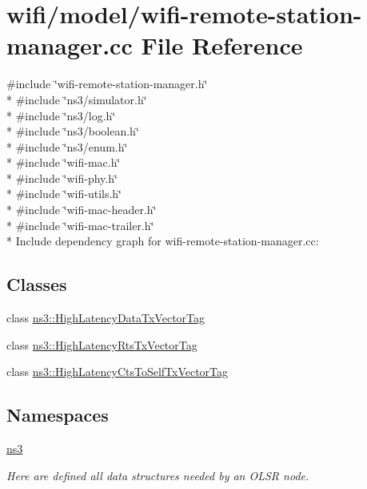 \hypertarget{wifi-remote-station-manager_8cc}{}\section{wifi/model/wifi-\/remote-\/station-\/manager.cc File Reference}
\label{wifi-remote-station-manager_8cc}
{\ttfamily \#include \char`\"{}wifi-\/remote-\/station-\/manager.\+h\char`\"{}}\\*
{\ttfamily \#include \char`\"{}ns3/simulator.\+h\char`\"{}}\\*
{\ttfamily \#include \char`\"{}ns3/log.\+h\char`\"{}}\\*
{\ttfamily \#include \char`\"{}ns3/boolean.\+h\char`\"{}}\\*
{\ttfamily \#include \char`\"{}ns3/enum.\+h\char`\"{}}\\*
{\ttfamily \#include \char`\"{}wifi-\/mac.\+h\char`\"{}}\\*
{\ttfamily \#include \char`\"{}wifi-\/phy.\+h\char`\"{}}\\*
{\ttfamily \#include \char`\"{}wifi-\/utils.\+h\char`\"{}}\\*
{\ttfamily \#include \char`\"{}wifi-\/mac-\/header.\+h\char`\"{}}\\*
{\ttfamily \#include \char`\"{}wifi-\/mac-\/trailer.\+h\char`\"{}}\\*
Include dependency graph for wifi-\/remote-\/station-\/manager.cc\+:
\subsection*{Classes}
\begin{DoxyCompactItemize}
\item 
class \hyperlink{classns3_1_1HighLatencyDataTxVectorTag}{ns3\+::\+High\+Latency\+Data\+Tx\+Vector\+Tag}
\item 
class \hyperlink{classns3_1_1HighLatencyRtsTxVectorTag}{ns3\+::\+High\+Latency\+Rts\+Tx\+Vector\+Tag}
\item 
class \hyperlink{classns3_1_1HighLatencyCtsToSelfTxVectorTag}{ns3\+::\+High\+Latency\+Cts\+To\+Self\+Tx\+Vector\+Tag}
\end{DoxyCompactItemize}
\subsection*{Namespaces}
\begin{DoxyCompactItemize}
\item 
 \hyperlink{namespacens3}{ns3}
\begin{DoxyCompactList}\small\item\em Here are defined all data structures needed by an O\+L\+SR node. \end{DoxyCompactList}\end{DoxyCompactItemize}
